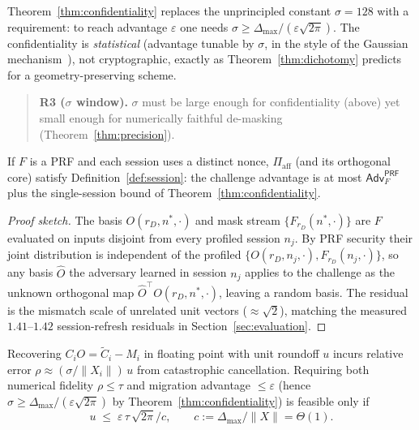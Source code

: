 Theorem~\ref{thm:confidentiality} replaces the unprincipled constant $\sigma=128$
with a requirement: to reach advantage $\varepsilon$ one needs
$\sigma\ge \Delta_{\max}/(\varepsilon\sqrt{2\pi})$. The confidentiality is
\emph{statistical} (advantage tunable by $\sigma$, in the style of the Gaussian
mechanism~\cite{dwork_calibrating}), not cryptographic, exactly as
Theorem~\ref{thm:dichotomy} predicts for a geometry-preserving scheme.

\begin{quote}
\textbf{R3 ($\sigma$ window).} $\sigma$ must be large enough for confidentiality
(above) yet small enough for numerically faithful de-masking
(Theorem~\ref{thm:precision}).
\end{quote}

\begin{theorem}
\label{thm:session}
If $F$ is a PRF and each session uses a distinct nonce, $\Pi_{\mathrm{aff}}$ (and
its orthogonal core) satisfy Definition~\ref{def:session}: the challenge advantage
is at most $\mathsf{Adv}^{\mathsf{PRF}}_F$ plus the single-session bound of
Theorem~\ref{thm:confidentiality}.
\end{theorem}

\begin{proof}[Proof sketch]
The basis $O(r_D,n^\ast,\cdot)$ and mask stream $\{F_{r_D}(n^\ast,\cdot)\}$ are
$F$ evaluated on inputs disjoint from every profiled session $n_j$. By PRF
security their joint distribution is independent of the profiled
$\{O(r_D,n_j,\cdot),F_{r_D}(n_j,\cdot)\}$, so any basis $\hat O$ the adversary
learned in session $n_j$ applies to the challenge as the unknown orthogonal map
$\hat O^\top O(r_D,n^\ast,\cdot)$, leaving a random basis. The residual is the
mismatch scale of unrelated unit vectors ($\approx\sqrt 2$), matching the measured
$1.41$--$1.42$ session-refresh residuals in Section~\ref{sec:evaluation}.
\end{proof}

\begin{theorem}
\label{thm:precision}
Recovering $C_iO=\tilde C_i-M_i$ in floating point with unit roundoff $u$ incurs
relative error $\rho\approx(\sigma/\lVert X_i\rVert)\,u$ from catastrophic
cancellation. Requiring both numerical fidelity $\rho\le\tau$ and migration
advantage $\le\varepsilon$ (hence $\sigma\ge\Delta_{\max}/(\varepsilon\sqrt{2\pi})$
by Theorem~\ref{thm:confidentiality}) is feasible only if
\[
u\;\le\;\varepsilon\,\tau\,\sqrt{2\pi}\Big/c,\qquad
c:=\Delta_{\max}/\lVert X\rVert=\Theta(1).
\]
\end{theorem}

